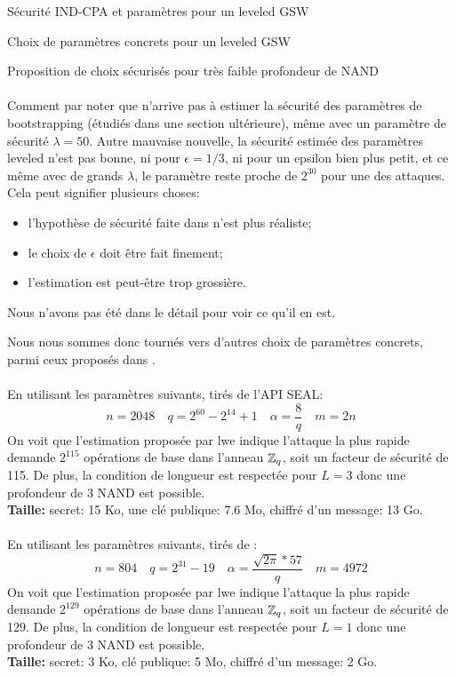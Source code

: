 \begin{section}{Sécurité IND-CPA et paramètres pour un leveled GSW}
\begin{subsection}{Choix de paramètres concrets pour un leveled GSW}
\begin{subsubsection}{Proposition de choix sécurisés pour très faible profondeur de NAND}
\paragraph{}

Comment par noter que  n'arrive pas à estimer la sécurité des paramètres de bootstrapping (étudiés
dans une section ultérieure), même 
avec un paramètre de sécurité $\lambda = 50$. Autre mauvaise nouvelle, la sécurité estimée des paramètres leveled
n'est pas bonne, ni pour $\epsilon = 1/3$, ni pour un epsilon bien plus petit, et ce même avec de grands $\lambda$, 
le paramètre  reste proche de $2^{30}$ pour une des attaques. Cela peut signifier plusieurs choses:
\begin{itemize}
\item l'hypothèse de sécurité faite dans \cite{halevi} n'est plus réaliste;
\item le choix de $\epsilon$ doit être fait finement;
\item l'estimation est peut-être trop grossière.
\end{itemize}
Nous n'avons pas été dans le détail pour voir ce qu'il en est.

Nous nous sommes donc tournés vers d'autres choix de paramètres concrets, parmi ceux proposés dans 
\cite{estimator}.

\paragraph{}
En utilisant les paramètres suivants, tirés de l'API SEAL: 
\[n = 2048\quad q = 2^{60} - 2^{14} + 1 \quad \alpha = \frac{8}{q}\quad m = 2n \] 
On voit que l'estimation proposée par lwe indique  l'attaque la plus rapide demande $2^{115}$
opérations de base dans l'anneau $\mathbb{Z}_q$, soit un facteur de sécurité de 115. De plus, la condition de longueur
est respectée pour $L=3$ donc une profondeur de 3 NAND est possible. \\ 
\textbf{Taille:} secret: 15 Ko, une clé publique: 7.6 Mo, chiffré d'un message: 13 Go.

\paragraph{}
En utilisant les paramètres suivants, tirés de \cite{cryptoeprint:2015:755}:
\[n = 804\quad  q = 2^{31} - 19\quad \alpha = \frac{\sqrt{2\pi}*57}{q} \quad m = 4972\]
On voit que l'estimation proposée par lwe indique  l'attaque la plus rapide demande $2^{129}$ opérations de base dans
l'anneau $\mathbb{Z}_q$, soit un facteur de sécurité de 129. De plus, la condition de longueur
est respectée pour $L=1$ donc une profondeur de 3 NAND est possible. \\ 
\textbf{Taille:} secret: 3 Ko, clé publique: 5 Mo, chiffré d'un message: 2 Go.
\end{subsubsection}
\end{subsection}
\end{section}
